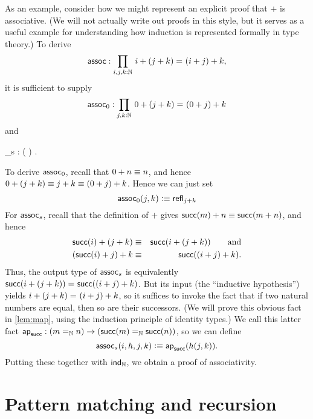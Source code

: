 As an example, consider how we might represent an explicit proof that $+$ is associative.
(We will not actually write out proofs in this style, but it serves as a useful example for understanding how induction is represented formally in type theory.)
To derive
\[\assoc : \prd{i,j,k:\nat} \id{i + (j + k)}{(i + j) + k}, \]
it is sufficient to supply
\[ \assoc_0 :  \prd{j,k:\nat} \id{0 + (j + k)}{(0+ j) + k} \]
and
\begin{narrowmultline*}
  \assoc_s  :  \left( \right)
   \narrowbreak
   \to {} .
\end{narrowmultline*}
To derive $\mathsf{assoc}_0$, recall that $0+n \equiv n$, and hence  $0 + (j + k) \equiv j+k \equiv (0+ j) + k$.
Hence we can just set
\[ \mathsf{assoc}_0(j,k) \vcentcolon\equiv \mathsf{refl}_{j+k} \]
For $\mathsf{assoc}_s$, recall that the definition of $+$ gives $\mathsf{succ}(m)+n \equiv \mathsf{succ}(m+n)$, and hence 
\begin{eqnarray*}
   \mathsf{succ}(i) + (j + k)  & \equiv & \mathsf{succ}(i+(j+k)) \qquad\text{and}\\
   (\mathsf{succ}(i)+j)+k & \equiv & \mathsf{succ}((i+j)+k).
\end{eqnarray*}
Thus, the output type of $\mathsf{assoc}_s$ is equivalently $\mathsf{succ}(i+(j+k)) =_{} \mathsf{succ}((i+j)+k)$.
But its input (the ``inductive hypothesis'')
%
%
yields $i+(j+k) =_{} (i+j)+k$, so it suffices to invoke the fact that if two natural numbers are equal, then so are their successors.
(We will prove this obvious fact in \autoref{lem:map}, using the induction principle of identity types.)
We call this latter fact
$\apfunc{\suc} : %
(\id[\nat]{m}{n}) \to (\id[\nat]{\suc(m)}{\suc(n)})$, so we can define
\[\assoc_s(i,h,j,k) \defeq \apfunc{\suc}( %
h(j,k)). \]
Putting these together with $\mathsf{ind}_{\mathbb{N}}$, we obtain a proof of associativity.

%
%


\section{Pattern matching and recursion}
\label{sec:pattern-matching}

